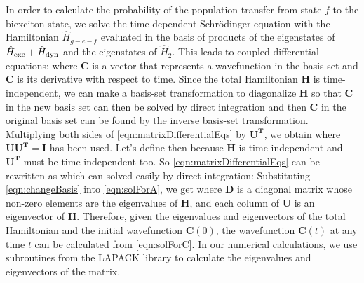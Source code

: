 In order to calculate the probability of the population transfer from state $f$ to the biexciton state, we solve the
 time-dependent Schr\"{o}dinger equation with the Hamiltonian $\hat{H}_{g-e-f}$ evaluated in the basis of products of
 the eigenstates of $\hat{H}_{\rm exc} + \hat{H}_{\rm dyn}$ and the eigenstates of $\hat{H}_2$. This leads to coupled
 differential equations:
where $\mathbf{C}$ is a vector that represents a wavefunction in the basis set and $\mathbf{\dot{C}}$ is its derivative
with respect to time. Since the total Hamiltonian $\mathbf{H}$ is time-independent, we can make a basis-set 
transformation to diagonalize $\mathbf{H}$
 so that $\mathbf{C}$ in the new basis set can then be solved by direct
 integration and then $\mathbf{C}$ in the original basis set can be found by the inverse basis-set transformation. 
Multiplying both sides of \autoref{eqn:matrixDifferentialEqs}  by $\mathbf{U^{T}}$, we obtain
where $ \mathbf{U} \mathbf{U^{T}} = \mathbf{I}$ has been used. Let's define
then
because $\mathbf{H}$ is time-independent and $\mathbf{U^{T}}$ must be time-independent too.  
So \autoref{eqn:matrixDifferentialEqs} can be rewritten as
which can solved easily by direct integration:
Substituting \autoref{eqn:changeBasis} into \autoref{eqn:solForA}, we get
where $\mathbf{D}$ is a diagonal matrix whose non-zero elements are the eigenvalues of $\mathbf{H}$, and each
column of $\mathbf{U}$ is an eigenvector of $\mathbf{H}$. Therefore, given the eigenvalues and eigenvectors of the
total Hamiltonian and the initial wavefunction $\mathbf{C}(0)$, the wavefunction $\mathbf{C}(t)$ at any time $t$ can
be calculated from \autoref{eqn:solForC}. In our numerical calculations, we use subroutines from the LAPACK library
to calculate the eigenvalues and eigenvectors of the matrix. 


